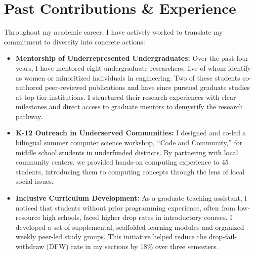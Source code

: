 \section{Past Contributions \& Experience}

Throughout my academic career, I have actively worked to translate my commitment to diversity into concrete actions:

\begin{itemize}
    \item \textbf{Mentorship of Underrepresented Undergraduates:} Over the past four years, I have mentored eight undergraduate researchers, five of whom identify as women or minoritized individuals in engineering. Two of these students co-authored peer-reviewed publications and have since pursued graduate studies at top-tier institutions. I structured their research experiences with clear milestones and direct access to graduate mentors to demystify the research pathway.
    \item \textbf{K-12 Outreach in Underserved Communities:} I designed and co-led a bilingual summer computer science workshop, ``Code and Community,'' for middle school students in underfunded districts. By partnering with local community centers, we provided hands-on computing experience to 45 students, introducing them to computing concepts through the lens of local social issues.
    \item \textbf{Inclusive Curriculum Development:} As a graduate teaching assistant, I noticed that students without prior programming experience, often from low-resource high schools, faced higher drop rates in introductory courses. I developed a set of supplemental, scaffolded learning modules and organized weekly peer-led study groups. This initiative helped reduce the drop-fail-withdraw (DFW) rate in my sections by 18\% over three semesters.
\end{itemize}
